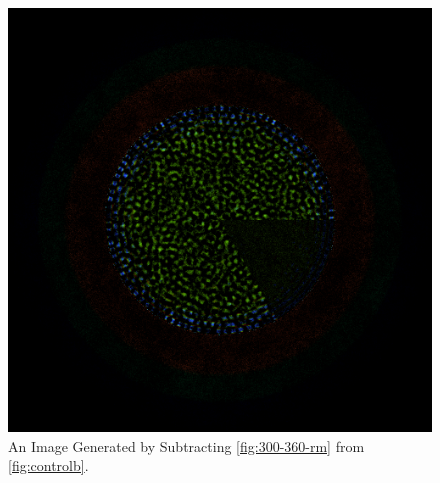 \begin{figure}[H]
\centering
\includegraphics[width=0.6\linewidth]{figures/300-360/diff-300-360}
\caption{An Image Generated by Subtracting \ref{fig:300-360-rm} from \ref{fig:controlb}.}
\label{fig:300-360-diff}
\end{figure}
